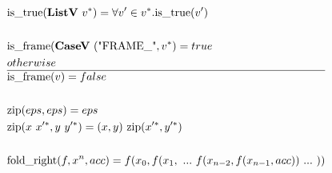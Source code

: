 \begin{align*}
  &\istrue(\listv ~ \seq v) = \forall v' \in \seq v. \istrue (v') \\
%
\newline \\
  &\isframe(\casev ~ (\text{"FRAME\_"}, \seq v) = true \\
  &otherwise \\
  \hline
  &\isframe(v) = false \\
%
\newline \\
  &\zip(eps, eps) = eps \\
  &\zip(x ~ \seq{x'}, y ~ \seq{y'}) = (x, y) ~ \zip (\seq{x'}, \seq{y'}) \\
%
\newline \\
  &\foldright(f, x^n, acc) = f(x_0, f(x_1, ~ ... ~ f(x_{n-2}, f(x_{n-1}, acc)) ~ ... ~ ))
\end{align*}





